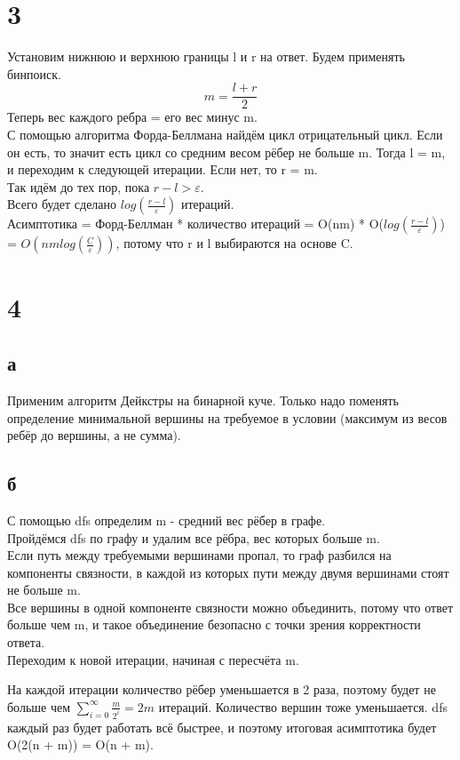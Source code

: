 \documentclass[12pt]{extarticle}
\begin{document}
\section*{3}
Установим нижнюю и верхнюю границы l и r на ответ. Будем применять бинпоиск.\\
\[m = \frac{l + r}{2}\]
Теперь вес каждого ребра = его вес минус m.\\
С помощью алгоритма Форда-Беллмана найдём цикл отрицательный цикл. Если он есть, то значит есть цикл со средним весом рёбер не больше m. Тогда l = m, и переходим к следующей итерации. Если нет, то r = m.\\
Так идём до тех пор, пока $r - l > \varepsilon$.\\
Всего будет сделано $log (\frac{r - l}{\varepsilon})$ итераций.\\
Асимптотика = Форд-Беллман * количество итераций = O(nm) * O($log (\frac{r - l}{\varepsilon})$) = $O(nm log(\frac{C}{\varepsilon}))$, потому что r и l выбираются на основе C.

\section*{4}
\subsection*{а}
Применим алгоритм Дейкстры на бинарной куче. Только надо поменять определение минимальной вершины на требуемое в условии (максимум из весов ребёр до вершины, а не сумма).

\subsection*{б}
С помощью dfs определим m - средний вес рёбер в графе.\\
Пройдёмся dfs по графу и удалим все рёбра, вес которых больше m.\\
Если путь между требуемыми вершинами пропал, то граф разбился на компоненты связности, в каждой из которых пути между двумя вершинами стоят не больше m.\\
Все вершины в одной компоненте связности можно объединить, потому что ответ больше чем m, и такое объединение безопасно с точки зрения корректности ответа.\\
Переходим к новой итерации, начиная с пересчёта m.

На каждой итерации количество рёбер уменьшается в 2 раза, поэтому будет не больше чем $\sum_{i=0}^\infty \frac{m}{2^i} = 2m$ итераций. Количество вершин тоже уменьшается. dfs каждый раз будет работать всё быстрее, и поэтому итоговая асимптотика будет O(2(n + m)) = O(n + m).
\end{document}
